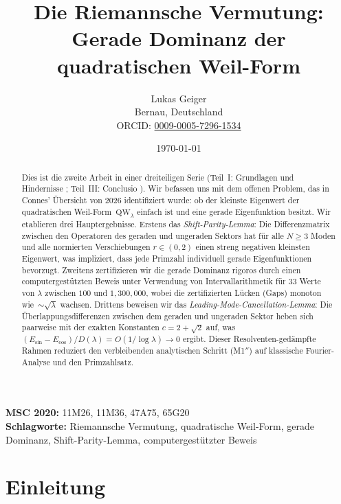 \documentclass[12pt,a4paper]{article}
\title{Die Riemannsche Vermutung:\\ Gerade Dominanz der quadratischen Weil-Form}
\author{Lukas Geiger\\
\small Bernau, Deutschland\\
\small ORCID: \href{https://orcid.org/0009-0005-7296-1534}{0009-0005-7296-1534}}
\date{\today}
\theoremstyle{definition}
\theoremstyle{remark}
\begin{document}
\overfullrule=0pt
\maketitle

\begin{abstract}
Dies ist die zweite Arbeit in einer dreiteiligen Serie (Teil~I: Grundlagen und Hindernisse \cite{Geiger2026partI}; Teil~III: Conclusio \cite{Geiger2026partIII}). Wir befassen uns mit dem offenen Problem, das in Connes' \"Ubersicht von 2026 \cite{Connes2026} identifiziert wurde: ob der kleinste Eigenwert der quadratischen Weil-Form~$\mathrm{QW}_\lambda$ einfach ist und eine gerade Eigenfunktion besitzt. Wir etablieren drei Hauptergebnisse. Erstens das \emph{Shift-Parity-Lemma}: Die Differenzmatrix zwischen den Operatoren des geraden und ungeraden Sektors hat f\"ur alle $N \geq 3$ Moden und alle normierten Verschiebungen $r \in (0,2)$ einen streng negativen kleinsten Eigenwert, was impliziert, dass jede Primzahl individuell gerade Eigenfunktionen bevorzugt. Zweitens zertifizieren wir die gerade Dominanz rigoros durch einen computergest\"utzten Beweis unter Verwendung von Intervallarithmetik f\"ur $33$ Werte von $\lambda$ zwischen $100$ und $1{,}300{,}000$, wobei die zertifizierten L\"ucken (Gaps) monoton wie~$\sim\!\sqrt{\lambda}$ wachsen. Drittens beweisen wir das \emph{Leading-Mode-Cancellation-Lemma}: Die \"Uberlappungsdifferenzen zwischen dem geraden und ungeraden Sektor heben sich paarweise mit der exakten Konstanten $c = 2 + \sqrt{2}$ auf, was $(E_{\sin} - E_{\cos})/D(\lambda) = O(1/\log\lambda) \to 0$ ergibt. Dieser Resolventen-ged\"ampfte Rahmen reduziert den verbleibenden analytischen Schritt (M1$''$) auf klassische Fourier-Analyse und den Primzahlsatz.
\end{abstract}

\noindent\textbf{MSC 2020:} 11M26, 11M36, 47A75, 65G20\\
\textbf{Schlagworte:} Riemannsche Vermutung, quadratische Weil-Form, gerade Dominanz, Shift-Parity-Lemma, computergest\"utzter Beweis

\newpage
\tableofcontents
\newpage

\section{Einleitung}
\label{sec:intro}
\end{document}
